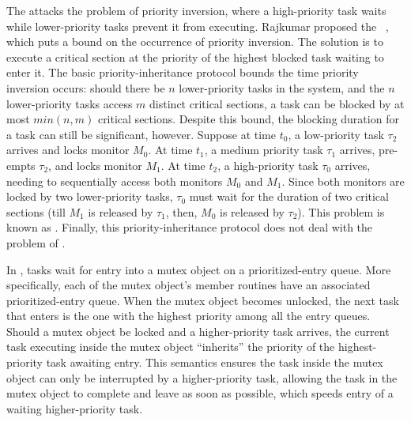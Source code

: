 \documentclass[openright,twoside]{report}
\begin{document}
The  attacks the problem of priority inversion, where a high-priority task waits while lower-priority tasks prevent it from executing.
Rajkumar proposed the ~\cite{Rajkumar88,Sha90b,Rajkumar91}, which puts a bound on the occurrence of priority inversion.
The solution is to execute a critical section at the priority of the highest blocked task waiting to enter it.
The basic priority-inheritance protocol bounds the time priority inversion occurs: should there be $n$ lower-priority tasks in the system, and the $n$ lower-priority tasks access $m$ distinct critical sections, a task can be blocked by at most $min(n,m)$ critical sections.
Despite this bound, the blocking duration for a task can still be significant, however.
Suppose at time $t_0$, a low-priority task $\tau_2$ arrives and locks monitor $M_0$.
At time $t_1$, a medium priority task $\tau_1$ arrives, pre-empts $\tau_2$, and locks monitor $M_1$.
At time $t_2$, a high-priority task $\tau_0$ arrives, needing to sequentially access both monitors $M_0$ and $M_1$.
Since both monitors are locked by two lower-priority tasks, $\tau_0$ must wait for the duration of two critical sections (till $M_1$ is released by $\tau_1$, then, $M_0$ is released by $\tau_2$).
This problem is known as .
Finally, this priority-inheritance protocol does not deal with the problem of .

In \uC, tasks wait for entry into a mutex object on a prioritized-entry queue.
More specifically, each of the mutex object's member routines have an associated prioritized-entry queue.
When the mutex object becomes unlocked, the next task that enters is the one with the highest priority among all the entry queues.
Should a mutex object be locked and a higher-priority task arrives, the current task executing inside the mutex object ``inherits'' the priority of the highest-priority task awaiting entry.
This semantics ensures the task inside the mutex object can only be interrupted by a higher-priority task, allowing the task in the mutex object to complete and leave as soon as possible, which speeds entry of a waiting higher-priority task.
\end{document}
